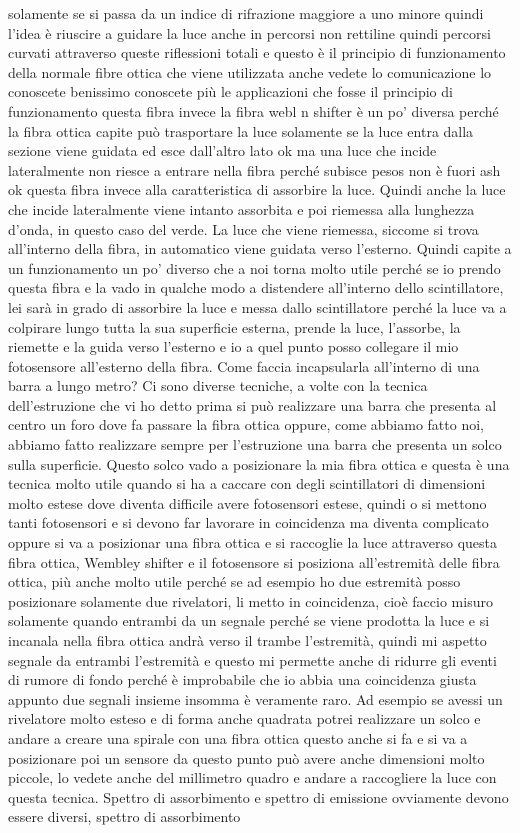 solamente se si passa da un indice di rifrazione maggiore a uno minore quindi l'idea è riuscire a guidare la luce anche in percorsi non rettiline quindi percorsi curvati attraverso queste riflessioni totali e questo è il principio di funzionamento della normale fibre ottica che viene utilizzata anche vedete lo comunicazione lo conoscete benissimo conoscete più le applicazioni che fosse il principio di funzionamento questa fibra invece la fibra webl n shifter è un po' diversa perché la fibra ottica capite può trasportare la luce solamente se la luce entra dalla sezione viene guidata ed esce dall'altro lato ok ma una luce che incide lateralmente non riesce a entrare nella fibra perché subisce pesos non è fuori ash ok questa fibra invece alla caratteristica di assorbire la luce. Quindi anche la luce che incide lateralmente viene intanto assorbita e poi riemessa alla lunghezza d'onda, in questo caso del verde. La luce che viene riemessa, siccome si trova all'interno della fibra, in automatico viene guidata verso l'esterno. Quindi capite a un funzionamento un po' diverso che a noi torna molto utile perché se io prendo questa fibra e la vado in qualche modo a distendere all'interno dello scintillatore, lei sarà in grado di assorbire la luce e messa dallo scintillatore perché la luce va a colpirare lungo tutta la sua superficie esterna, prende la luce, l'assorbe, la riemette e la guida verso l'esterno e io a quel punto posso collegare il mio fotosensore all'esterno della fibra. Come faccia incapsularla all'interno di una barra a lungo metro? Ci sono diverse tecniche, a volte con la tecnica dell'estruzione che vi ho detto prima si può realizzare una barra che presenta al centro un foro dove fa passare la fibra ottica oppure, come abbiamo fatto noi, abbiamo fatto realizzare sempre per l'estruzione una barra che presenta un solco sulla superficie. Questo solco vado a posizionare la mia fibra ottica e questa è una tecnica molto utile quando si ha a caccare con degli scintillatori di dimensioni molto estese dove diventa difficile avere fotosensori estese, quindi o si mettono tanti fotosensori e si devono far lavorare in coincidenza ma diventa complicato oppure si va a posizionar una fibra ottica e si raccoglie la luce attraverso questa fibra ottica, Wembley shifter e il fotosensore si posiziona all'estremità delle fibra ottica, più anche molto utile perché se ad esempio ho due estremità posso posizionare solamente due rivelatori, li metto in coincidenza, cioè faccio misuro solamente quando entrambi da un segnale perché se viene prodotta la luce e si incanala nella fibra ottica andrà verso il trambe l'estremità, quindi mi aspetto segnale da entrambi l'estremità e questo mi permette anche di ridurre gli eventi di rumore di fondo perché è improbabile che io abbia una coincidenza giusta appunto due segnali insieme insomma è veramente raro. Ad esempio se avessi un rivelatore molto esteso e di forma anche quadrata potrei realizzare un solco e andare a creare una spirale con una fibra ottica questo anche si fa e si va a posizionare poi un sensore da questo punto può avere anche dimensioni molto piccole, lo vedete anche del millimetro quadro e andare a raccogliere la luce con questa tecnica. Spettro di assorbimento e spettro di emissione ovviamente devono essere diversi, spettro di assorbimento 
